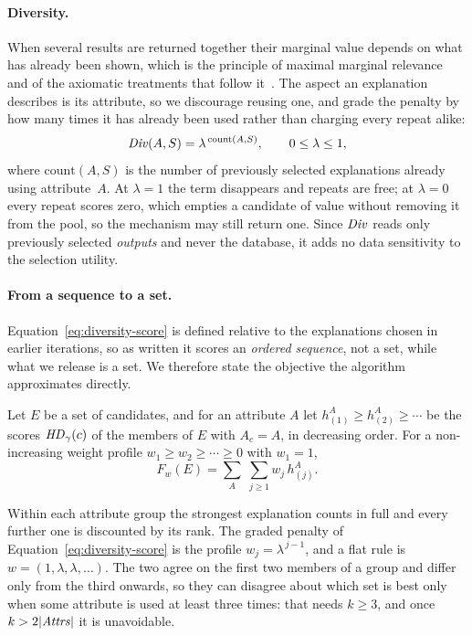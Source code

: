 \paragraph{Diversity.}
When several results are returned together their marginal value depends on what has already been shown, which is the principle of maximal marginal relevance~\cite{MMR} and of the axiomatic treatments that follow it~\cite{GollapudiS09,LinBilmes11}.
The aspect an explanation describes is its attribute, so we discourage reusing one, and grade the penalty by how many times it has already been used rather than charging every repeat alike:
\begin{equation}
\mathit{Div}(A,S)=\lambda^{\,\mathrm{count}(A,S)},
\qquad 0\le\lambda\le1,
\label{eq:diversity-score}
\end{equation}
where $\mathrm{count}(A,S)$ is the number of previously selected explanations already using attribute~$A$.
At $\lambda=1$ the term disappears and repeats are free; at $\lambda=0$ every repeat scores zero, which empties a candidate of value without removing it from the pool, so the mechanism may still return one.
Since $\mathit{Div}$ reads only previously selected \emph{outputs} and never the database, it adds no data sensitivity to the selection utility.

\paragraph{From a sequence to a set.}
Equation~\eqref{eq:diversity-score} is defined relative to the explanations chosen in earlier iterations, so as written it scores an \emph{ordered sequence}, not a set, while what we release is a set.
We therefore state the objective the algorithm approximates directly.

\begin{definition}
\label{def:setobj}
Let $E$ be a set of candidates, and for an attribute $A$ let
$h^A_{(1)}\ge h^A_{(2)}\ge\cdots$ be the scores $\mathit{HD}_\gamma(c)$ of the members of $E$ with $A_c=A$, in decreasing order.
For a non-increasing weight profile $w_1\ge w_2\ge\cdots\ge0$ with $w_1=1$,
\begin{equation}
F_w(E)=\sum_{A}\;\sum_{j\ge1} w_j\, h^A_{(j)} .
\label{eq:set-objective}
\end{equation}
\end{definition}

Within each attribute group the strongest explanation counts in full and every further one is discounted by its rank.
The graded penalty of Equation~\eqref{eq:diversity-score} is the profile $w_j=\lambda^{\,j-1}$, and a flat rule is $w=(1,\lambda,\lambda,\dots)$.
The two agree on the first two members of a group and differ only from the third onwards, so they can disagree about which set is best only when some attribute is used at least three times: that needs $k\ge3$, and once $k>2|\mathit{Attrs}|$ it is unavoidable.

